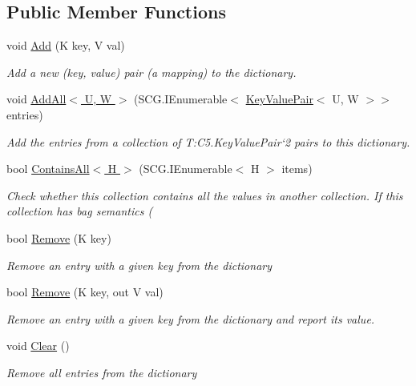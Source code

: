 \subsection*{Public Member Functions}
\begin{DoxyCompactItemize}
\item 
void \hyperlink{interface_c5_1_1_i_dictionary_a7e3eefcf603863fe54ce86080bbc07d7}{Add} (K key, V val)
\begin{DoxyCompactList}\small\item\em Add a new (key, value) pair (a mapping) to the dictionary. \end{DoxyCompactList}\item 
void \hyperlink{interface_c5_1_1_i_dictionary_aa6cfac9dc29e58092c4dd65190f431af}{Add\+All$<$ U, W $>$} (S\+C\+G.\+I\+Enumerable$<$ \hyperlink{struct_c5_1_1_key_value_pair}{Key\+Value\+Pair}$<$ U, W $>$$>$ entries)
\begin{DoxyCompactList}\small\item\em Add the entries from a collection of T\+:\+C5.\+Key\+Value\+Pair`2 pairs to this dictionary. \end{DoxyCompactList}\item 
bool \hyperlink{interface_c5_1_1_i_dictionary_a18a33ccf0bac3ac7ef8046850104c5d5}{Contains\+All$<$ H $>$} (S\+C\+G.\+I\+Enumerable$<$ H $>$ items)
\begin{DoxyCompactList}\small\item\em Check whether this collection contains all the values in another collection. If this collection has bag semantics ( \end{DoxyCompactList}\item 
bool \hyperlink{interface_c5_1_1_i_dictionary_a35b1f0b9f0e0c555246b9154b6e45ab5}{Remove} (K key)
\begin{DoxyCompactList}\small\item\em Remove an entry with a given key from the dictionary \end{DoxyCompactList}\item 
bool \hyperlink{interface_c5_1_1_i_dictionary_a24f34aa709dc1157536afb1d251135d5}{Remove} (K key, out V val)
\begin{DoxyCompactList}\small\item\em Remove an entry with a given key from the dictionary and report its value. \end{DoxyCompactList}\item 
void \hyperlink{interface_c5_1_1_i_dictionary_a9eb0026921a6b39c781495efd65dc82b}{Clear} ()
\begin{DoxyCompactList}\small\item\em Remove all entries from the dictionary \end{DoxyCompactList}\item 
$$
\end{DoxyCompactItemize}
